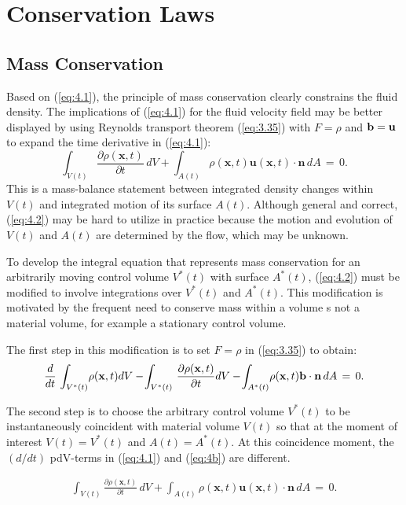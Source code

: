 \documentclass{article}
\begin{document}
\section{Conservation Laws}

\subsection{Mass Conservation}

Based on (\ref{eq:4.1}), the principle of mass conservation clearly constrains the fluid density. The implications of (\ref{eq:4.1}) for the fluid velocity field may be better displayed by using Reynolds transport theorem (\ref{eq:3.35}) with $F=\rho$ and ${\bf b}={\bf u}$ to expand the time derivative in (\ref{eq:4.1}):
$$
\int_{V ( t )} \frac{\partial\rho( \mathbf{x}, t )} {\partial t} \, d V+\int_{A ( t )} \rho( \mathbf{x}, t ) \mathbf{u} ( \mathbf{x}, t ) \cdot\mathbf{n} \, d A \,=\, 0. \tag{42}
$$
This is a mass-balance statement between integrated density changes within $V ( t )$ and integrated motion of its surface $A ( t )$. Although general and correct, (\ref{eq:4.2}) may be hard to utilize in practice because the motion and evolution of $V ( t )$ and $A ( t )$ are determined by the flow, which may be unknown.

To develop the integral equation that represents mass conservation for an arbitrarily moving control volume $V^{*} ( t )$ with surface $A^{*} ( t )$, (\ref{eq:4.2}) must be modified to involve integrations over $V^{*} ( t )$ and $A^{*} ( t )$. This modification is motivated by the frequent need to conserve mass within a volume s not a material volume, for example a stationary control volume.

The first step in this modification is to set $F=\rho$ in (\ref{eq:3.35}) to obtain:
$$
\frac{d} {d t} \, \int_{V^{*} ( t )} \! \rho( {\bf x}, t ) d V-\! \int_{V^{*} ( t )} \, \frac{\partial\rho( {\bf x}, t )} {\partial t} d V-\! \int_{A^{*} ( t )} \! \rho( {\bf x}, t ) {\bf b} \cdot{\bf n} \, d A \,=\, 0.
$$

The second step is to choose the arbitrary control volume $V^{*} ( t )$ to be instantaneously coincident with material volume $V ( t )$ so that at the moment of interest $V ( t )=V^{*} ( t )$ and $A ( t )=A^{*} ( t )$. At this coincidence moment, the $(d/dt)$ pdV-terms in (\ref{eq:4.1}) and (\ref{eq:4b}) are different.

\begin{align*}
\int_{V ( t )} \frac{\partial\rho( \mathbf{x}, t )} {\partial t} \, d V+\int_{A ( t )} \rho( \mathbf{x}, t ) \mathbf{u} ( \mathbf{x}, t ) \cdot\mathbf{n} \, d A \,=\, 0.
\end{align*}
\end{document}
